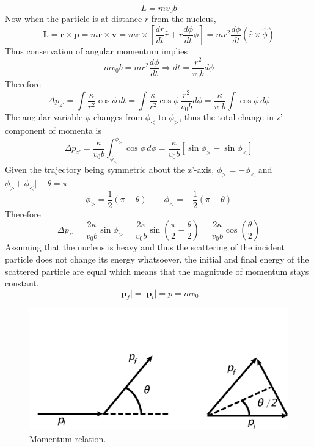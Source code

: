 \documentclass[aps,prb,onecolumn,notitlepage,showpacs,floatfix,superscriptaddress]{revtex4-1}
\begin{document}
\begin{equation}
L=mv_0 b
\end{equation}
Now when the particle is at distance $r$ from the nucleus, 
\begin{equation}
{\bm L} = {\bm r} \times {\bm p} =m {\bm r} \times {\bm v} = m {\bm r} \times \left[ \dfrac{dr}{dt} \hat{r} + r \dfrac{d\phi}{dt} \hat{\phi} \right] = m r^2 \dfrac{d\phi}{dt} (\hat{r}\times\hat{\phi})
\end{equation}
Thus conservation of angular momentum implies
\begin{equation}
mv_0 b = mr^2 \dfrac{d\phi}{dt} \Rightarrow dt = \dfrac{r^2}{v_0 b} d\phi
\end{equation}
Therefore
\begin{equation}
\Delta p_{z'} =  \int \dfrac{\kappa}{r^2} \cos\phi \, dt = \int \dfrac{\kappa}{r^2} \cos\phi \,  \dfrac{r^2}{v_0 b} d\phi = \dfrac{\kappa}{v_0 b} \int\cos\phi \, d\phi
\end{equation}
The angular variable $\phi$ changes from $\phi_<$ to $\phi_>$, thus the total change in z'-component of momenta is
\begin{equation}
\Delta p_{z'} = \dfrac{\kappa}{v_0 b} \int_{\phi_<}^{\phi_>}\cos\phi \, d\phi = \dfrac{\kappa}{v_0 b} [\sin\phi_{>}-\sin\phi_{<}]
\end{equation}
Given the trajectory being symmetric about the z'-axis, $\phi_> = -\phi_<$ and $\phi_{>}+\vert \phi_< \vert +\theta =\pi$ 
\begin{equation}
\phi_> = \dfrac{1}{2}(\pi-\theta) \qquad \phi_< = -\dfrac{1}{2}(\pi-\theta)
\end{equation}
Therefore
\begin{equation}
\Delta p_{z'} = \dfrac{2\kappa}{v_0 b} \sin\phi_{>} =  \dfrac{2\kappa}{v_0 b} \sin\left(\dfrac{\pi}{2}-\dfrac{\theta}{2} \right)= \dfrac{2\kappa}{v_0 b} \cos\left(\dfrac{\theta}{2} \right)
\end{equation}
Assuming that the nucleus is heavy and thus the scattering of the incident particle does not change its energy whatsoever, the initial and final energy of the scattered particle are equal which means that the magnitude of momentum stays constant. 
\begin{equation}
\vert {\bm p}_f \vert = \vert {\bm p}_i \vert = p = m v_0
\end{equation}
\begin{figure}[hbtp]
\centering
\includegraphics[scale=0.1]{momentum.png}
\caption{Momentum relation.}
\end{figure}
\end{document}
